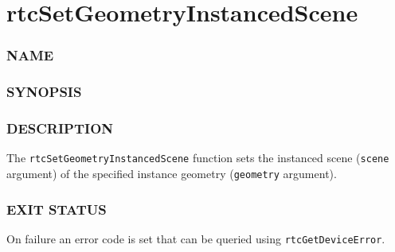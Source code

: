 \pagebreak

\section{rtcSetGeometryInstancedScene}\label{rtcsetgeometryinstancedscene}

\subsubsection{NAME}\label{name}

\begin{Shaded}
\begin{Highlighting}[]
\OperatorTok{{-}}
\end{Highlighting}
\end{Shaded}

\subsubsection{SYNOPSIS}\label{synopsis}

\begin{Shaded}
\begin{Highlighting}[]

\OperatorTok{(}
\OperatorTok{,}
\OperatorTok{);}
\end{Highlighting}
\end{Shaded}

\subsubsection{DESCRIPTION}\label{description}

The \texttt{rtcSetGeometryInstancedScene} function sets the instanced
scene (\texttt{scene} argument) of the specified instance geometry
(\texttt{geometry} argument).

\subsubsection{EXIT STATUS}\label{exit-status}

On failure an error code is set that can be queried using
\texttt{rtcGetDeviceError}.

